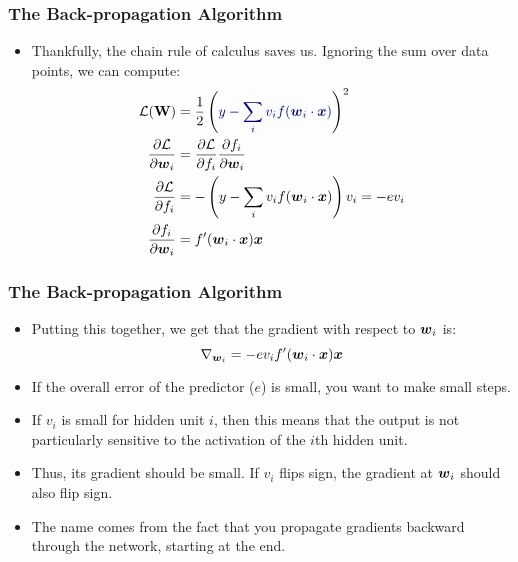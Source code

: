 \documentclass[trans]{beamer}
\begin{document}
\begin{frame}
  \frametitle{The Back-propagation Algorithm}
\begin{itemize}
\item
Thankfully, the chain rule of calculus saves us.  Ignoring the sum
over data points, we can compute:
%
\begin{align}
\cL(\mat W) &= 
\frac 1 2 \left( \textcolor{darkblue}{y - 
     \sum_i v_i f(\dotp{\vec w_i}{\vx})}
     \right)^2
\\
\frac {\partial \cL} {\partial \vec w_i}
&= \frac {\partial \cL} {\partial f_i}
   \frac {\partial f_i}   {\partial \vec w_i}
\\
\frac {\partial \cL} {\partial f_i}
&= -\left(y - \sum_i v_i f(\dotp{\vec w_i}{\vx})\right) v_i
= -e v_i
\\
\frac {\partial f_i} {\partial \vec w_i}
&= f'(\dotp{\vec w_i}{\vx}) \vx
\end{align}
%
\end{itemize}
\end{frame}

\begin{frame}
  \frametitle{The Back-propagation Algorithm}
\begin{itemize}
\item
Putting this together, we get that the gradient with respect to
${\boldsymbol{w}}_i$ is:
%
\begin{equation}
\nabla_{{\boldsymbol{w}}_i}
= -e v_i f'({\boldsymbol{w}}_i \cdot {\boldsymbol{x}}) \boldsymbol{x}
\end{equation}
%
\item  If the overall error of the
predictor ($e$) is small, you want to make small steps.  
\item If $v_i$ is
small for hidden unit $i$, then this means that the output is not
particularly sensitive to the activation of the $i$th hidden unit.
\item 
Thus, its gradient should be small.  If $v_i$ flips sign, the gradient
at ${\boldsymbol{w}}_i$ should also flip sign.
\item  The name
 comes from the fact that you propagate
gradients backward through the network, starting at the end.
\end{itemize}
\end{frame}
\end{document}
